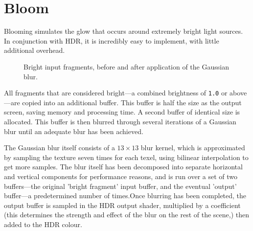 \documentclass[11pt, oneside]{report}
\begin{document}
\section{Bloom}
Blooming simulates the glow that occurs around extremely bright light sources. In conjunction with \gls{HDR}, it is incredibly easy to implement, with little additional overhead.

\begin{figure}[!htbp]
  \centering
  \hfill
  \caption{Bright input fragments, before and after application of the Gaussian blur.}
\end{figure}

All fragments that are considered bright---a combined brightness of \texttt{1.0} or above---are copied into an additional buffer. This buffer is half the size as the output screen, saving memory and processing time. A second buffer of identical size is allocated. This buffer is then blurred through several iterations of a Gaussian blur until an adequate blur has been achieved.

The Gaussian blur itself consists of a $13 \times 13$ blur kernel, which is approximated by sampling the texture seven times for each \gls{texel}, using bilinear interpolation to get more samples. The blur itself has been decomposed into separate horizontal and vertical components for performance reasons, and is run over a set of two buffers---the original 'bright fragment' input buffer, and the eventual 'output' buffer---a predetermined number of times.Once blurring has been completed, the output buffer is sampled in the \gls{HDR} output shader, multiplied by a coefficient (this determines the strength and effect of the blur on the rest of the scene,) then added to the \gls{HDR} colour.
\end{document}
